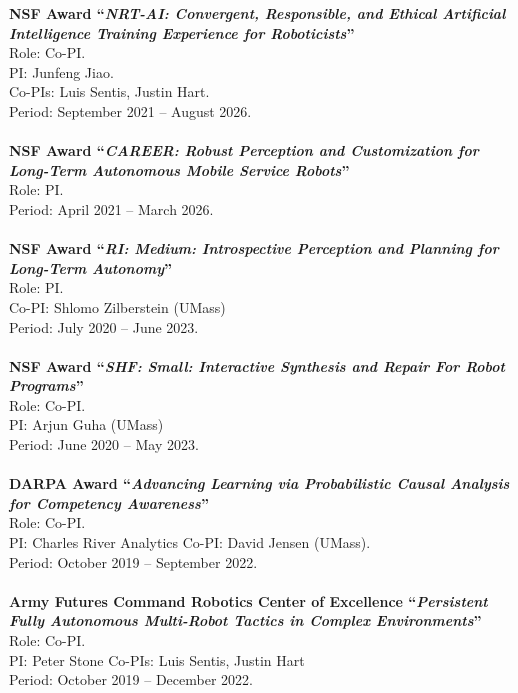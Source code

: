 \documentclass[Times]{article}
\newcommand{\funding}[1]{#1\\}
\renewcommand{\funding}[1]{\\}
\begin{document}
\textbf{NSF Award ``\emph{NRT-AI: Convergent, Responsible, and Ethical Artificial Intelligence Training Experience for Roboticists}''}\\
Role: Co-PI.\\
PI: Junfeng Jiao.\\
Co-PIs: Luis Sentis, Justin Hart.\\
Period: September 2021 -- August 2026.\\
\funding{Amount: \$2,999,999.}

\textbf{NSF Award ``\emph{CAREER: Robust Perception and Customization for Long-Term Autonomous Mobile Service Robots}''}\\
Role: PI.\\
Period: April 2021 -- March 2026.\\
\funding{Amount: \$590,469.}

\textbf{NSF Award ``\emph{RI: Medium: Introspective Perception and Planning for Long-Term Autonomy}''}\\
Role: PI.\\
Co-PI: Shlomo Zilberstein (UMass)\\
Period: July 2020 -- June 2023.\\
\funding{PI Biswas' share: \$600,000.}

\textbf{NSF Award ``\emph{SHF: Small: Interactive Synthesis and Repair For Robot Programs}''}\\
Role: Co-PI.\\
PI: Arjun Guha (UMass)\\
Period: June 2020 -- May 2023.\\
\funding{PI Biswas' share: \$250,001.}

\textbf{DARPA Award ``\emph{Advancing Learning via Probabilistic Causal Analysis for Competency Awareness}''}\\
Role: Co-PI.\\
PI: Charles River Analytics
Co-PI: David Jensen (UMass).\\
Period: October 2019 -- September 2022.\\
\funding{PI Biswas' share: \$587,810.}

\textbf{Army Futures Command Robotics Center of Excellence ``\emph{Persistent Fully Autonomous Multi-Robot Tactics in Complex Environments}''}\\
Role: Co-PI.\\
PI: Peter Stone
Co-PIs: Luis Sentis, Justin Hart\\
Period: October 2019 -- December 2022.\\
\funding{Total funding: \$1,457,250.}
\end{document}
